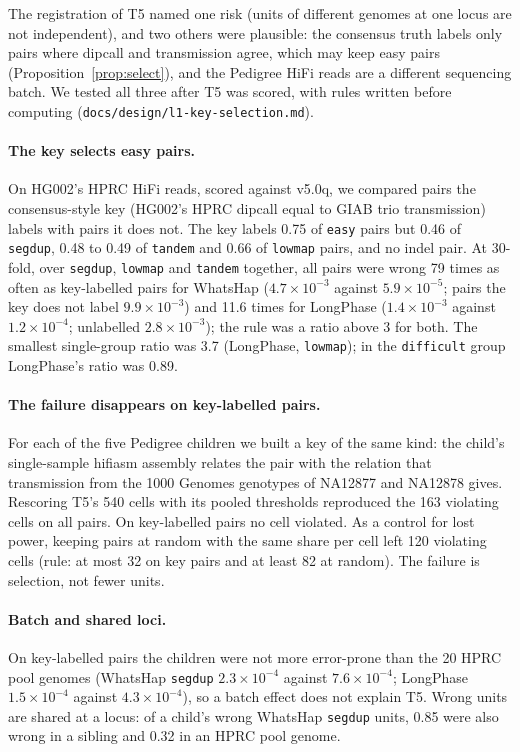 \documentclass[11pt]{article}
\theoremstyle{definition}
\theoremstyle{remark}
\begin{document}
The registration of T5 named one risk (units of different genomes at one
locus are not independent), and two others were plausible: the consensus
truth labels only pairs where dipcall and transmission agree, which may
keep easy pairs (Proposition~\ref{prop:select}), and the Pedigree HiFi reads
are a different sequencing batch. We tested all three after T5 was scored,
with rules written before computing (\nolinkurl{docs/design/l1-key-selection.md}).

\paragraph{The key selects easy pairs.} On HG002's HPRC HiFi reads, scored
against v5.0q, we compared pairs the consensus-style key (HG002's HPRC
dipcall equal to GIAB trio transmission) labels with pairs it does not. The
key labels 0.75 of \texttt{easy} pairs but 0.46 of \texttt{segdup}, 0.48 to
0.49 of \texttt{tandem} and 0.66 of \texttt{lowmap} pairs, and no indel pair.
At 30-fold, over \texttt{segdup}, \texttt{lowmap} and \texttt{tandem}
together, all pairs were wrong 79 times as often as key-labelled pairs for
WhatsHap ($4.7\times10^{-3}$ against $5.9\times10^{-5}$; pairs the key does
not label $9.9\times10^{-3}$) and 11.6 times for LongPhase ($1.4\times10^{-3}$
against $1.2\times10^{-4}$; unlabelled $2.8\times10^{-3}$); the rule was a
ratio above 3 for both. The smallest single-group ratio was 3.7
(LongPhase, \texttt{lowmap}); in the \texttt{difficult} group LongPhase's
ratio was 0.89.

\paragraph{The failure disappears on key-labelled pairs.} For each of the
five Pedigree children we built a key of the same kind: the child's
single-sample hifiasm assembly relates the pair with the relation that
transmission from the 1000 Genomes genotypes of NA12877 and NA12878 gives.
Rescoring T5's 540 cells with its pooled thresholds reproduced the 163
violating cells on all pairs. On key-labelled pairs no cell violated. As a
control for lost power, keeping pairs at random with the same share per
cell left 120 violating cells (rule: at most 32 on key pairs and at least
82 at random). The failure is selection, not fewer units.

\paragraph{Batch and shared loci.} On key-labelled pairs the children were
not more error-prone than the 20 HPRC pool genomes (WhatsHap \texttt{segdup}
$2.3\times10^{-4}$ against $7.6\times10^{-4}$; LongPhase
$1.5\times10^{-4}$ against $4.3\times10^{-4}$), so a batch effect does not
explain T5. Wrong units are shared at a locus: of a child's wrong WhatsHap
\texttt{segdup} units, 0.85 were also wrong in a sibling and 0.32 in an HPRC
pool genome.
\end{document}

